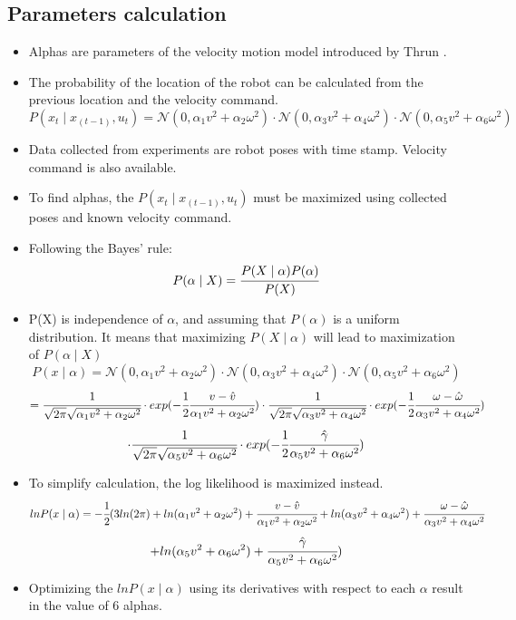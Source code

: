 \documentclass[paper=a4, fontsize=11pt]{scrartcl} %
\begin{document}
    \subsection{Parameters calculation}
    \begin{itemize}
        \item Alphas are parameters of the velocity motion model introduced by Thrun \cite{Thrun}.
        \item The probability of the location of the robot can be calculated from the previous location and the velocity command.
        \[
        P(x_t \mid x_(t-1),u_t) = \mathcal{N}(0,\alpha_1 v^2 + \alpha_2 \omega^2) \cdot \mathcal{N}(0,\alpha_3 v^2 + \alpha_4 \omega^2) \cdot \mathcal{N}(0,\alpha_5 v^2 + \alpha_6 \omega^2) 
        \]
        \item Data collected from experiments are robot poses with time stamp. Velocity command is also available.
        \item To find alphas, the $P(x_t \mid x_(t-1),u_t)$ must be maximized using collected poses and known velocity command.
        \item Following the Bayes' rule:
        \[
        P(\alpha \mid X) = \cfrac{P(X \mid \alpha) P(\alpha)}{P(X)}
        \]
        \item P(X) is independence of $\alpha$, and assuming that $P(\alpha)$ is a uniform distribution. It means that maximizing $P(X \mid \alpha)$ will lead to maximization of $P(\alpha \mid X)$
        \[
        P(x \mid \alpha) = \mathcal{N}(0,\alpha_1 v^2 + \alpha_2 \omega^2) \cdot \mathcal{N}(0,\alpha_3 v^2 + \alpha_4 \omega^2) \cdot \mathcal{N}(0,\alpha_5 v^2 + \alpha_6 \omega^2)
        \]
        \[
        = \cfrac{1}{\sqrt{2\pi} \sqrt{\alpha_1 v^2 + \alpha_2 \omega^2}} \cdot exp(-\cfrac{1}{2}\cfrac{v - \hat{v}}{\alpha_1 v^2 + \alpha_2 \omega^2}) \cdot \cfrac{1}{\sqrt{2\pi} \sqrt{\alpha_3 v^2 + \alpha_4 \omega^2}} \cdot exp(-\cfrac{1}{2}\cfrac{\omega - \hat{\omega}}{\alpha_3 v^2 + \alpha_4 \omega^2}) 
        \]
        \[	
        \cdot \cfrac{1}{\sqrt{2\pi} \sqrt{\alpha_5 v^2 + \alpha_6 \omega^2}} \cdot exp(-\cfrac{1}{2}\cfrac{\hat{\gamma}}{\alpha_5 v^2 + \alpha_6 \omega^2})
        \]
        
        \item To simplify calculation, the log likelihood is maximized instead.
        \[
        ln P(x \mid \alpha) = - \cfrac{1}{2}( 3ln(2\pi) + ln(\alpha_1 v^2 + \alpha_2 \omega^2) + \cfrac{v - \hat{v}}{\alpha_1 v^2 + \alpha_2 \omega^2} + ln(\alpha_3 v^2 + \alpha_4 \omega^2) + \cfrac{\omega - \hat{\omega}}{\alpha_3 v^2 + \alpha_4 \omega^2} 
        \]
        \[
        + ln(\alpha_5 v^2 + \alpha_6 \omega^2) + \cfrac{\hat{\gamma}}{\alpha_5 v^2 + \alpha_6 \omega^2})
        \]
        \item Optimizing the $ln P(x \mid \alpha)$ using its derivatives with respect to each $\alpha$ result in the value of 6 alphas.
    \end{itemize}
\end{document}
